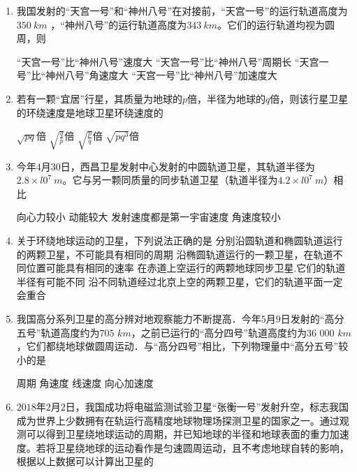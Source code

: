 \begin{enumerate}[leftmargin=0em]
\item 
{}
我国发射的“天宫一号”和“神州八号”在对接前，“天宫一号”的运行轨道高度为$ 350 \ km $ ，“神州八号”的运行轨道高度为$ 343 \ km $。它们的运行轨道均视为圆周，则  

\fourchoices
{“天宫一号”比“神州八号”速度大}
{“天宫一号”比“神州八号”周期长}
{“天宫一号”比“神州八号”角速度大}
{“天宫一号”比“神州八号”加速度大}



\item 
{}
若有一颗“宜居”行星，其质量为地球的$ p $倍，半径为地球的$ q $倍，则该行星卫星的环绕速度是地球卫星环绕速度的  

\fourchoices
{$\sqrt{pq}$倍}
{$\sqrt{\frac{q}{p}}$倍}
{$\sqrt{\frac{p}{q}}$倍}
{$\sqrt{pq^{3}}$倍}


\item 
{}
今年$ 4 $月$ 30 $日，西昌卫星发射中心发射的中圆轨道卫星，其轨道半径为$ 2.8 \times l0^7\ m $。它与另一颗同质量的同步轨道卫星（轨道半径为$ 4.2 \times l0^7 \ m $）相比  

\fourchoices
{向心力较小 }
{动能较大}
{发射速度都是第一宇宙速度}
{角速度较小}



\item 
{}
关于环绕地球运动的卫星，下列说法正确的是  
\fourchoices
{分别沿圆轨道和椭圆轨道运行的两颗卫星，不可能具有相同的周期}
{沿椭圆轨道运行的一颗卫星，在轨道不同位置可能具有相同的速率}
{在赤道上空运行的两颗地球同步卫星.它们的轨道半径有可能不同}
{沿不同轨道经过北京上空的两颗卫星，它们的轨道平面一定会重合}



\item 
{}
我国高分系列卫星的高分辨对地观察能力不断提高．今年$ 5 $月$ 9 $日发射的“高分五号”轨道高度约为$ 705 $ $ km $，之前已运行的“高分四号”轨道高度约为$ 36 $ $ 000 $ $ km $，它们都绕地球做圆周运动．与“高分四号”相比，下列物理量中“高分五号”较小的是  

\fourchoices
{周期 }
{角速度}
{线速度}
{向心加速度}


\item 
{}
$ 2018 $年$ 2 $月$ 2 $日，我国成功将电磁监测试验卫星“张衡一号”发射升空，标志我国成为世界上少数拥有在轨运行高精度地球物理场探测卫星的国家之一。通过观测可以得到卫星绕地球运动的周期，并已知地球的半径和地球表面的重力加速度。若将卫星绕地球的运动看作是匀速圆周运动，且不考虑地球自转的影响，根据以上数据可以计算出卫星的  


\end{enumerate}
